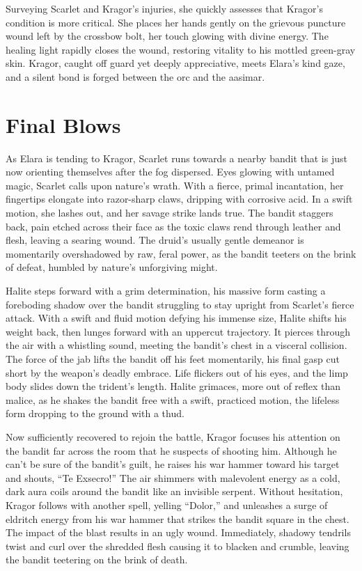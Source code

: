 \documentclass[
  letterpaper,12pt,twoside,twocolumn,openany,
  nodeprecatedcode,bg=full]{dndbook}
\begin{document}
Surveying Scarlet and Kragor's injuries, she quickly assesses that
Kragor's condition is more critical. She places her hands gently on the
grievous puncture wound left by the crossbow bolt, her touch glowing
with divine energy. The healing light rapidly closes the wound,
restoring vitality to his mottled green-gray skin. Kragor, caught off
guard yet deeply appreciative, meets Elara's kind gaze, and a silent
bond is forged between the orc and the aasimar.

\section{Final Blows}\label{final-blows}

As Elara is tending to Kragor, Scarlet runs towards a nearby bandit that
is just now orienting themselves after the fog dispersed. Eyes glowing
with untamed magic, Scarlet calls upon nature's wrath. With a fierce,
primal incantation, her fingertips elongate into razor-sharp claws,
dripping with corrosive acid. In a swift motion, she lashes out, and her
savage strike lands true. The bandit staggers back, pain etched across
their face as the toxic claws rend through leather and flesh, leaving a
searing wound. The druid's usually gentle demeanor is momentarily
overshadowed by raw, feral power, as the bandit teeters on the brink of
defeat, humbled by nature's unforgiving might.

Halite steps forward with a grim determination, his massive form casting
a foreboding shadow over the bandit struggling to stay upright from
Scarlet's fierce attack. With a swift and fluid motion defying his
immense size, Halite shifts his weight back, then lunges forward with an
uppercut trajectory. It pierces through the air with a whistling sound,
meeting the bandit's chest in a visceral collision. The force of the jab
lifts the bandit off his feet momentarily, his final gasp cut short by
the weapon's deadly embrace. Life flickers out of his eyes, and the limp
body slides down the trident's length. Halite grimaces, more out of
reflex than malice, as he shakes the bandit free with a swift, practiced
motion, the lifeless form dropping to the ground with a thud.

Now sufficiently recovered to rejoin the battle, Kragor focuses his
attention on the bandit far across the room that he suspects of shooting
him. Although he can't be sure of the bandit's guilt, he raises his war
hammer toward his target and shouts, ``Te Exsecro!'' The air shimmers
with malevolent energy as a cold, dark aura coils around the bandit like
an invisible serpent. Without hesitation, Kragor follows with another
spell, yelling ``Dolor,'' and unleashes a surge of eldritch energy from
his war hammer that strikes the bandit square in the chest. The impact
of the blast results in an ugly wound. Immediately, shadowy tendrils
twist and curl over the shredded flesh causing it to blacken and
crumble, leaving the bandit teetering on the brink of death.
\end{document}
